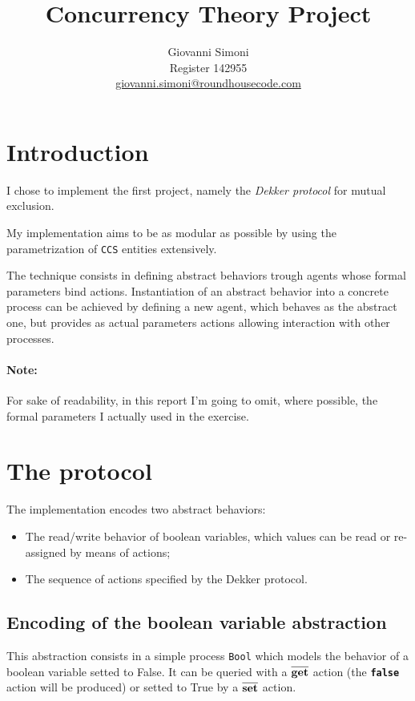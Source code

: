 \documentclass[10pt,a4paper]{article}
\title {
    Concurrency Theory Project
}
\author{
    Giovanni Simoni\\
    Register 142955\\
    \href{mailto:giovanni.simoni@roundhousecode.com}
         {giovanni.simoni@roundhousecode.com}
}
\newcommand{\Note}[1]{\paragraph{Note:}{#1}}
\newcommand{\CCS}{{\tt CCS}}
\newcommand{\Agent}[1]{{\tt {#1}}}
\newcommand{\Action}[1]{{\tt \bf {#1}}}
\newcommand{\CoAction}[1]{$\overline{\mbox{\Action{#1}}}$}
\begin{document}
\maketitle

\section{Introduction}
\label{sec:Intro}

    I chose to implement the first project, namely the \emph{Dekker
    protocol} for mutual exclusion.

    My implementation aims to be as modular as possible by using the
    parametrization of \CCS{} entities extensively.

    The technique consists in defining abstract behaviors trough agents
    whose formal parameters bind actions. Instantiation of an
    abstract behavior into a concrete process can be achieved by defining
    a new agent, which behaves as the abstract one, but provides as
    actual parameters actions allowing interaction with other
    processes.

    \Note{
        For sake of readability, in this report I'm going to omit, where
        possible, the formal parameters I actually used in the exercise.
    }

\section{The protocol}

    The implementation encodes two abstract behaviors:

    \begin{itemize}

    \item   The read/write behavior of boolean variables, which values can
            be read or re-assigned by means of actions;

    \item   The sequence of actions specified by the Dekker
            protocol.

    \end{itemize}

    \subsection{Encoding of the boolean variable abstraction}
    \label{sub:EncodeBool}

        This abstraction consists in a simple process \Agent{Bool} which
        models the behavior of a boolean variable setted to False. It can
        be queried with a \CoAction{get} action (the \Action{false} action
        will be produced) or setted to True by a \CoAction{set} action.
\end{document}
